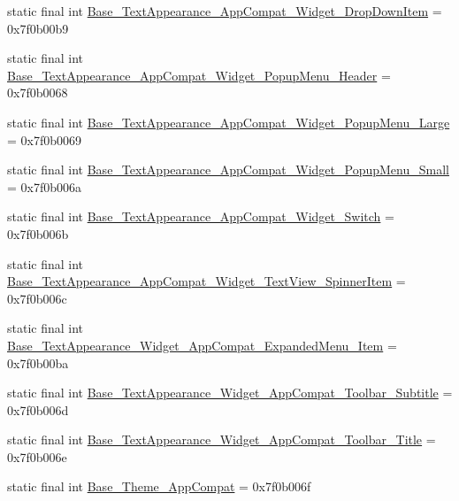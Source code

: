 \begin{CompactItemize}
\item 
static final int \hyperlink{classandroid_1_1support_1_1graphics_1_1drawable_1_1animated_1_1_r_1_1style_08e49fba6ba25c6801011c5275b9fca7}{Base\_\-TextAppearance\_\-AppCompat\_\-Widget\_\-DropDownItem} = 0x7f0b00b9
\item 
static final int \hyperlink{classandroid_1_1support_1_1graphics_1_1drawable_1_1animated_1_1_r_1_1style_7ee82a05eadc809477f5d9bb7f06339f}{Base\_\-TextAppearance\_\-AppCompat\_\-Widget\_\-PopupMenu\_\-Header} = 0x7f0b0068
\item 
static final int \hyperlink{classandroid_1_1support_1_1graphics_1_1drawable_1_1animated_1_1_r_1_1style_9b378e3863ae44171b4384ab1893ed9b}{Base\_\-TextAppearance\_\-AppCompat\_\-Widget\_\-PopupMenu\_\-Large} = 0x7f0b0069
\item 
static final int \hyperlink{classandroid_1_1support_1_1graphics_1_1drawable_1_1animated_1_1_r_1_1style_03bf6352b8d217a2150551b8872ea508}{Base\_\-TextAppearance\_\-AppCompat\_\-Widget\_\-PopupMenu\_\-Small} = 0x7f0b006a
\item 
static final int \hyperlink{classandroid_1_1support_1_1graphics_1_1drawable_1_1animated_1_1_r_1_1style_8559b7b07c591f1fbf95bd2a3786d52f}{Base\_\-TextAppearance\_\-AppCompat\_\-Widget\_\-Switch} = 0x7f0b006b
\item 
static final int \hyperlink{classandroid_1_1support_1_1graphics_1_1drawable_1_1animated_1_1_r_1_1style_39f33476586cdcb13908a5533fc34b9e}{Base\_\-TextAppearance\_\-AppCompat\_\-Widget\_\-TextView\_\-SpinnerItem} = 0x7f0b006c
\item 
static final int \hyperlink{classandroid_1_1support_1_1graphics_1_1drawable_1_1animated_1_1_r_1_1style_6f7a54656a6b12a05b380df95ac2f86b}{Base\_\-TextAppearance\_\-Widget\_\-AppCompat\_\-ExpandedMenu\_\-Item} = 0x7f0b00ba
\item 
static final int \hyperlink{classandroid_1_1support_1_1graphics_1_1drawable_1_1animated_1_1_r_1_1style_c3f9b5ac6a92eb24fffe28a3f646e477}{Base\_\-TextAppearance\_\-Widget\_\-AppCompat\_\-Toolbar\_\-Subtitle} = 0x7f0b006d
\item 
static final int \hyperlink{classandroid_1_1support_1_1graphics_1_1drawable_1_1animated_1_1_r_1_1style_1a6f23773132c5d50a63b2349223c939}{Base\_\-TextAppearance\_\-Widget\_\-AppCompat\_\-Toolbar\_\-Title} = 0x7f0b006e
\item 
static final int \hyperlink{classandroid_1_1support_1_1graphics_1_1drawable_1_1animated_1_1_r_1_1style_cfffcd509f113ea4303d779bf7c9ed17}{Base\_\-Theme\_\-AppCompat} = 0x7f0b006f

\end{CompactItemize}
